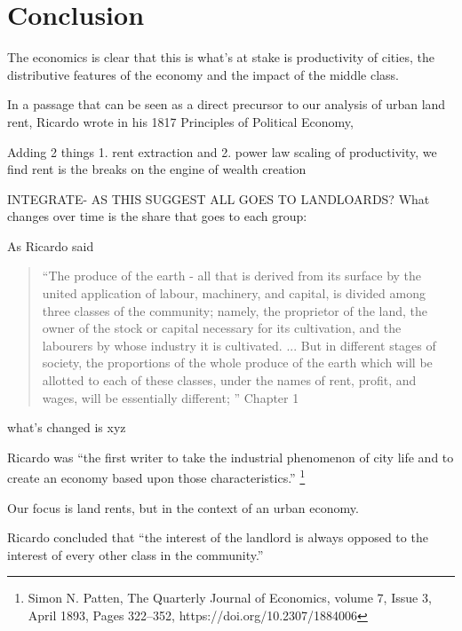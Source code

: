 

\chapter{Conclusion}


The economics is clear that this is what's at stake is productivity of cities, the distributive features of the economy and the impact of the middle class.

In a passage that can be seen as a direct precursor to our analysis of urban land rent, Ricardo  wrote in his 1817 Principles of Political Economy, %

Adding 2 things 1. rent extraction and 2. power law scaling of productivity, we find rent is the breaks on the engine of wealth creation

INTEGRATE- AS THIS SUGGEST ALL GOES TO LANDLOARDS?
What changes over time is the share that goes to each group:

As Ricardo said

\begin{quotation}   
 “The produce of the earth - all that is derived from its surface by the united application of labour, machinery, and capital, is divided among three classes of the community; namely, the proprietor of the land, the owner of the stock or capital necessary for its cultivation, and the labourers by whose industry it is cultivated. ...  But in different stages of society, the proportions of the whole produce of the earth which will be allotted to each of these classes, under the names of rent, profit, and wages, will be essentially different; ”  Chapter 1
\end{quotation}

what's changed is xyz

Ricardo was ``the first writer to take the industrial phenomenon of city life and to create an economy based upon those characteristics.''  \footnote{Simon N. Patten,  The Quarterly Journal of Economics, volume 7, Issue 3, April 1893, Pages 322–352, https://doi.org/10.2307/1884006 }  

Our focus is land rents, but in the context of an urban economy. 

{Ricardo concluded that %
``the interest of the landlord is always opposed to the interest of every other class in the community.'' }



